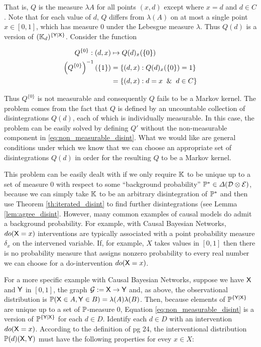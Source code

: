 That is, $Q$ is the measure $\lambda{A}$ for all points $(x,d)$ except where $x=d$ and $d\in C$. Note that for each value of $d$, $Q$ differs from $\lambda(A)$ on at most a single point $x\in[0,1]$, which has measure $0$ under the Lebesgue measure $\lambda$. Thus $Q(d)$ is a version of $(\mathbb{K}_d)^{\{\mathsf{Y}|\mathsf{X}\}}$. Consider the function

\begin{align}
	Q^{\{0\}}:(d,x)&\mapsto Q(d)_x(\{0\})\\
	\left(Q^{\{0\}}\right)^{-1}(\{1\})&=\{(d,x):Q(d)_x(\{0\})=1\}\\
	&= \{(d,x):d=x\And d\in C\}
\end{align}

Thus $Q^{\{0\}}$ is not measurable and consequently $Q$ fails to be a Markov kernel. The problem comes from the fact that $Q$ is defined by an uncountable collection of disintegrations $Q(d)$, each of which is individually measurable. In this case, the problem can be easily solved by defining $Q'$ without the non-measurable component in \ref{eq:non_measurable_disint}. What we would like are general conditions under which we know that we can choose an appropriate set of disintegrations $Q(d)$ in order for the resulting $Q$ to be a Markov kernel.

This problem can be easily dealt with if we only require $\mathbb{K}$ to be unique up to a set of measure 0 with respect to some ``background probability'' $\mathbb{P}^*\in\Delta(\mathcal{D}\otimes\mathcal{E})$, because we can simply take $\mathbb{K}$ to be an arbitrary disintegration of $\mathbb{P}^*$ and then use Theorem \ref{th:iterated_disint} to find further disintegrations (see Lemma \ref{lem:agree_disint}. However, many common examples of causal models do admit a background probability. For example, with Causal Bayesian Networks, $do(\mathsf{X}=x)$ interventions are typically associated with a point probability measure $\delta_x$ on the intervened variable. If, for example, $X$ takes values in $[0,1]$ then there is no probability measure that assigns nonzero probability to every real number we can choose for a do-intervention $do(\mathsf{X}=x)$.

For a more specific example with Causal Bayesian Networks, suppose we have $\mathsf{X}$ and $\mathsf{Y}$ in $[0,1]$, the graph $\mathcal{G}:=\mathsf{X}\rightarrow \mathsf{Y}$ and, as above, the observational distribution is $\mathbb{P}(\mathsf{X}\in A,\mathsf{Y}\in B)=\lambda(A)\lambda(B)$. Then, because elements of $\mathbb{P}^{\{\mathsf{Y}|\mathsf{X}\}}$ are unique up to a set of $\mathbb{P}$-measure 0, Equation \ref{eq:non_measurable_disint} is a version of $\mathbb{P}^{\{\mathsf{Y}|\mathsf{X}\}}$ for each $d\in D$. Identify each $d\in D$ with an intervention $do(\mathsf{X}=x)$. According to the definition of \citet{pearl_causality:_2009} pg 24, the interventional distribution $\mathbb{P}(d)(\mathsf{X},\mathsf{Y})$ must have the following properties for evey $x\in X$:

